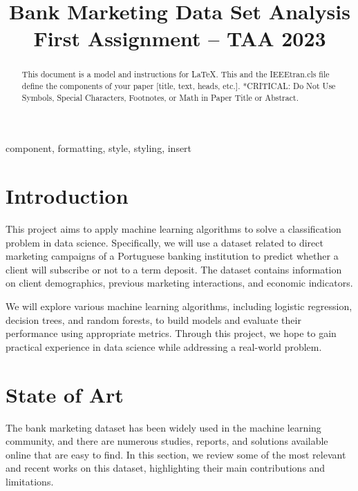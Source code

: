 \documentclass[conference]{IEEEtran}
\begin{document}
\title{Bank Marketing Data Set Analysis\\
{\footnotesize First Assignment -- TAA 2023}
}

\author{
\and
{}
}

\maketitle

\begin{abstract}
This document is a model and instructions for \LaTeX.
This and the IEEEtran.cls file define the components of your paper [title, text, heads, etc.]. *CRITICAL: Do Not Use Symbols, Special Characters, Footnotes, 
or Math in Paper Title or Abstract.
\end{abstract}

\begin{IEEEkeywords}
component, formatting, style, styling, insert
\end{IEEEkeywords}

\section{Introduction}
This project aims to apply machine learning algorithms to solve a classification problem in data science. Specifically, we will use a dataset related to direct marketing campaigns of a Portuguese banking institution to predict whether a client will subscribe or not to a term deposit. The dataset contains information on client demographics, previous marketing interactions, and economic indicators.

We will explore various machine learning algorithms, including logistic regression, decision trees, and random forests, to build models and evaluate their performance using appropriate metrics. Through this project, we hope to gain practical experience in data science while addressing a real-world problem.

\section{State of Art}
The bank marketing dataset has been widely used in the machine learning community, and there are numerous studies, reports, and solutions available online that are easy to find. In this section, we review some of the most relevant and recent works on this dataset, highlighting their main contributions and limitations.
\end{document}
